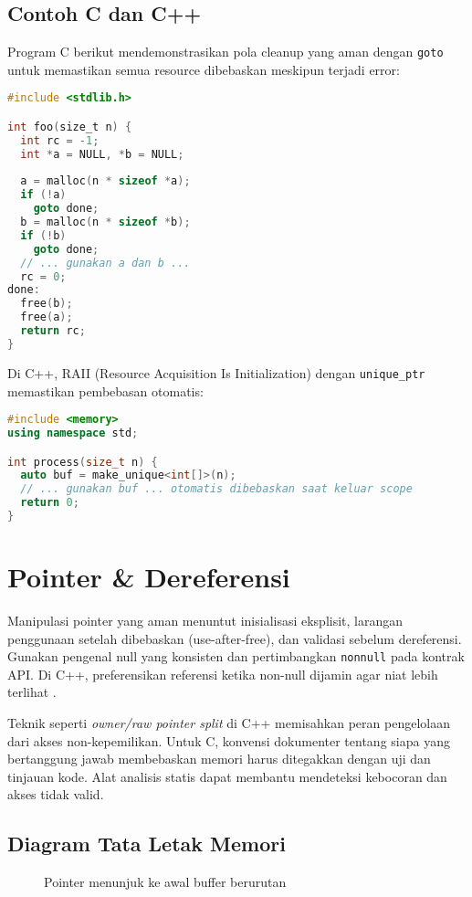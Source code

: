 \documentclass[../main.tex]{subfiles}
\begin{document}
\subsection{Contoh C dan C++}

Program C berikut mendemonstrasikan pola cleanup yang aman dengan \texttt{goto} untuk memastikan semua resource dibebaskan meskipun terjadi error:

\begin{lstlisting}[language=C, caption={Pola cleanup bertahap di C}]
#include <stdlib.h>

int foo(size_t n) {
  int rc = -1;
  int *a = NULL, *b = NULL;
  
  a = malloc(n * sizeof *a);
  if (!a)
    goto done;
  b = malloc(n * sizeof *b);
  if (!b)
    goto done;
  // ... gunakan a dan b ...
  rc = 0;
done:
  free(b);
  free(a);
  return rc;
}
\end{lstlisting}

Di C++, RAII (Resource Acquisition Is Initialization) dengan \texttt{unique\_ptr} memastikan pembebasan otomatis:

\begin{lstlisting}[language=C++, caption={RAII dengan unique\_ptr di C++}]
#include <memory>
using namespace std;

int process(size_t n) {
  auto buf = make_unique<int[]>(n);
  // ... gunakan buf ... otomatis dibebaskan saat keluar scope
  return 0;
}
\end{lstlisting}

\section{Pointer \& Dereferensi}
Manipulasi pointer yang aman menuntut inisialisasi eksplisit, larangan penggunaan setelah dibebaskan (use-after-free), dan validasi sebelum dereferensi. Gunakan pengenal null yang konsisten dan pertimbangkan \texttt{nonnull} pada kontrak API. Di C++, preferensikan referensi ketika non-null dijamin agar niat lebih terlihat \parencite{gnu-c-manual,cpp-reference}.

Teknik seperti \emph{owner/raw pointer split} di C++ memisahkan peran pengelolaan dari akses non-kepemilikan. Untuk C, konvensi dokumenter tentang siapa yang bertanggung jawab membebaskan memori harus ditegakkan dengan uji dan tinjauan kode. Alat analisis statis dapat membantu mendeteksi kebocoran dan akses tidak valid.

\subsection{Diagram Tata Letak Memori}
\begin{figure}[H]
  \centering
  \caption{Pointer menunjuk ke awal buffer berurutan}
\end{figure}
\end{document}
